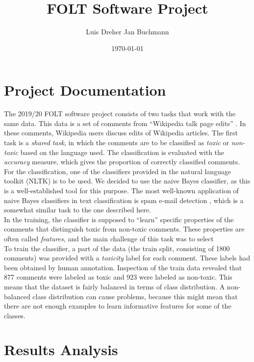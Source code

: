\documentclass[11pt,a4paper]{article}
\title{FOLT Software Project}
\author{Luis Dreher \And Jan Buchmann}
\date{\today}
\begin{document}
\maketitle


\section{Project Documentation}
The 2019/20 FOLT software project consists of two tasks that work with the same data. This data is a set of comments from ``Wikipedia talk page edits'' \cite{taskdescription}. In these comments, Wikipedia users discuss edits of Wikipedia articles. The first task is a \textit{shared task}, in which the comments are to be classified as \textit{toxic} or \textit{non-toxic} based on the language used. The classification is evaluated with the \textit{accuracy} measure, which gives the proportion of correctly classified comments. \\
For the classification, one of the classifiers provided in the natural language toolkit (NLTK) \citep{nltkbook} is to be used. We decided to use the naive Bayes classifier, as this is a well-established tool for this purpose. The most well-known application of naive Bayes classifiers in text classification is spam e-mail detection \cite{naivebayesspam}, which is a somewhat similar task to the one described here. \\
In the training, the classifier is supposed to ``learn'' specific properties of the comments that distinguish toxic from non-toxic comments. These properties are often called \textit{features}, and the main challenge of this task was to select \\
To train the classifier, a part of the data (the train split, consisting of 1800 comments) was provided with a \textit{toxicity} label for each comment. These labels had been obtained by human annotation. Inspection of the train data revealed that 877 comments were labeled as toxic and 923 were labeled as non-toxic. This means that the dataset is fairly balanced in terms of class distribution. A non-balanced class distribution can cause problems, because this might mean that there are not enough examples to learn informative features for some of the classes.

\section{Results Analysis}



\end{document}
